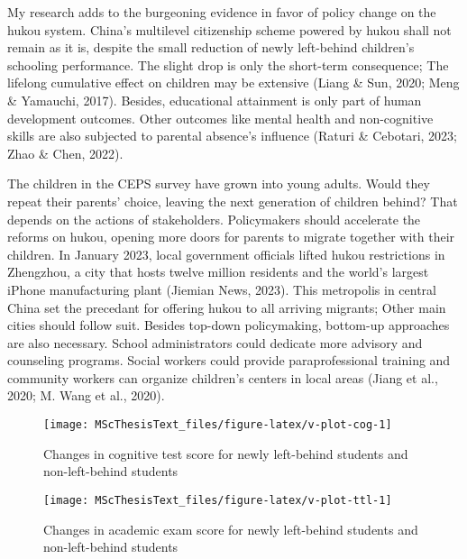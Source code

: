 \documentclass[
  man]{apa7}
\begin{document}
My research adds to the burgeoning evidence in favor of policy change on the hukou system. China's multilevel citizenship scheme powered by hukou shall not remain as it is, despite the small reduction of newly left-behind children's schooling performance. The slight drop is only the short-term consequence; The lifelong cumulative effect on children may be extensive (Liang \& Sun, 2020; Meng \& Yamauchi, 2017). Besides, educational attainment is only part of human development outcomes. Other outcomes like mental health and non-cognitive skills are also subjected to parental absence's influence (Raturi \& Cebotari, 2023; Zhao \& Chen, 2022).

The children in the CEPS survey have grown into young adults. Would they repeat their parents' choice, leaving the next generation of children behind? That depends on the actions of stakeholders. Policymakers should accelerate the reforms on hukou, opening more doors for parents to migrate together with their children. In January 2023, local government officials lifted hukou restrictions in Zhengzhou, a city that hosts twelve million residents and the world's largest iPhone manufacturing plant (Jiemian News, 2023). This metropolis in central China set the precedant for offering hukou to all arriving migrants; Other main cities should follow suit. Besides top-down policymaking, bottom-up approaches are also necessary. School administrators could dedicate more advisory and counseling programs. Social workers could provide paraprofessional training and community workers can organize children's centers in local areas (Jiang et al., 2020; M. Wang et al., 2020).

\newpage



















\begin{figure}
\texttt{[image: MScThesisText\_files/figure-latex/v-plot-cog-1]} \caption{Changes in cognitive test score for newly left-behind students and non-left-behind students}\label{fig:v-plot-cog}
\end{figure}

\begin{figure}
\texttt{[image: MScThesisText\_files/figure-latex/v-plot-ttl-1]} \caption{Changes in academic exam score for newly left-behind students and non-left-behind students}\label{fig:v-plot-ttl}
\end{figure}
\end{document}
